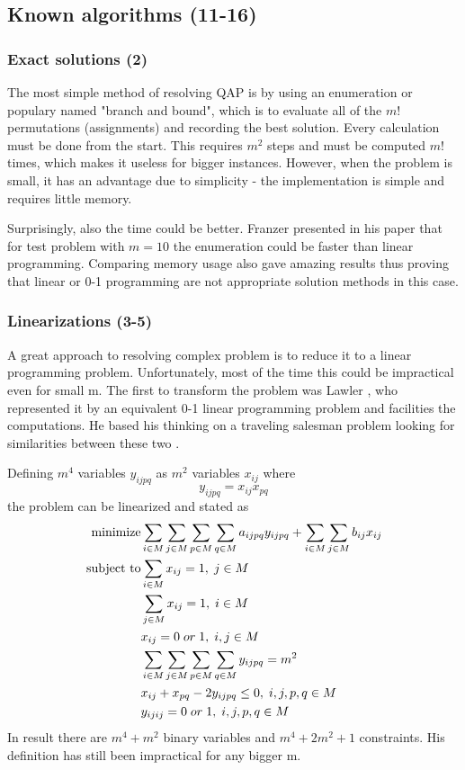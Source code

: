 \subsection{Known algorithms (11-16)}
\subsubsection{Exact solutions (2)}

The most simple method of resolving QAP is by using an enumeration or populary named "branch and bound", which is to evaluate all of the $m!$ permutations (assignments) and recording the best solution.
Every calculation must be done from the start.
This requires $m^2$ steps and must be computed $m!$ times, which makes it useless for bigger instances.
However, when the problem is small, it has an advantage due to simplicity - the implementation is simple and requires little memory.

Surprisingly, also the time could be better. Franzer presented in his paper \cite{frazer1997602} that for test problem with $m=10$ the enumeration could be faster than linear programming. Comparing memory usage also gave amazing results thus proving that linear or 0-1 programming are not appropriate solution methods in this case.

\subsubsection{Linearizations (3-5)}
A great approach to resolving complex problem is to reduce it to a linear programming problem.
Unfortunately, most of the time this could be impractical even for small m.
The first to transform the problem was Lawler \cite{lawler1963}, who represented it by an equivalent 0-1 linear programming problem and facilities the computations. He based his thinking on a traveling salesman problem looking for similarities between these two \cite{charnsethikul1988exact}.

Defining $m^4$ variables $y_{ijpq}$ as $m^2$ variables $x_{ij}$ where
\begin{equation}
y_{ijpq} = x_{ij}x_{pq}
\end{equation}
the problem can be linearized and stated as
\begin{align}
  \text{minimize} &\null \sum_{i \in M} \sum_{j \in M} \sum_{p \in M} \sum_{q \in M} a_{ijpq}y_{ijpq} + \sum_{i \in M} \sum_{j \in M} b_{ij} x_{ij} \\
  \text{subject to} &\null \sum_{i \in M} x_{ij} = 1, \; j \in M \\
  &\null \sum_{j \in M} x_{ij} = 1, \; i \in M \\
  &\null x_{ij} = 0 \; or \; 1, \; i, j \in M \\
  &\null \sum_{i \in M} \sum_{j \in M} \sum_{p \in M} \sum_{q \in M} y_{ijpq} = m^2 \; \\
  &\null x_{ij} + x_{pq} - 2y_{ijpq} \leq 0, \; i, j, p, q \in M \\
  &\null y_{ijij} = 0 \; or \; 1, \; i, j, p, q \in M \\
\end{align}
In result there are $m^4 + m^2$ binary variables and $m^4 + 2 m^2 + 1$ constraints.
His definition has still been impractical for any bigger m.

